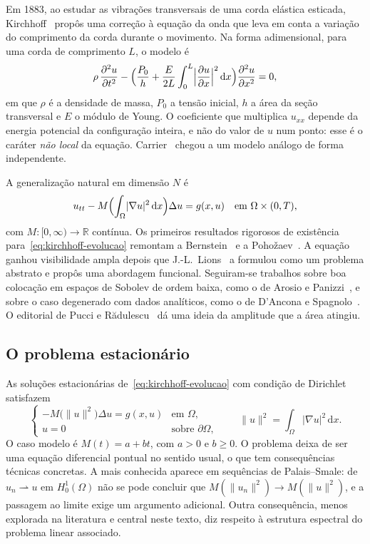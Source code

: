 \documentclass[11pt,a4paper]{article}
\theoremstyle{plain}
\theoremstyle{definition}
\theoremstyle{remark}
\newcommand{\R}{\mathbb{R}}
\newcommand{\Hz}{H_0^1(\Omega)}
\newcommand{\norm}[1]{\lVert #1\rVert}
\newcommand{\abs}[1]{\lvert #1\rvert}
\newcommand{\dx}{\,\mathrm{d}x}
\begin{document}
Em 1883, ao estudar as vibrações transversais de uma corda elástica esticada,
Kirchhoff~\cite{Kirchhoff1883} propôs uma correção à equação da onda que leva em
conta a variação do comprimento da corda durante o movimento. Na forma
adimensional, para uma corda de comprimento $L$, o modelo é
\begin{equation}\label{eq:kirchhoff-original}
\rho\, \frac{\partial^2 u}{\partial t^2}
-\Bigl(\frac{P_0}{h}+\frac{E}{2L}\int_0^L\Bigl|\frac{\partial u}{\partial x}\Bigr|^2\dx\Bigr)
\frac{\partial^2 u}{\partial x^2}=0,
\end{equation}
em que $\rho$ é a densidade de massa, $P_0$ a tensão inicial, $h$ a área da
seção transversal e $E$ o módulo de Young. O coeficiente que multiplica
$u_{xx}$ depende da energia potencial da configuração inteira, e não do valor de
$u$ num ponto: esse é o caráter \emph{não local} da equação. Carrier~\cite{Carrier1945}
chegou a um modelo análogo de forma independente.

A generalização natural em dimensão $N$ é
\begin{equation}\label{eq:kirchhoff-evolucao}
u_{tt}-M\Bigl(\int_\Omega\abs{\nabla u}^2\dx\Bigr)\Delta u=g(x,u)\quad\text{em }\Omega\times(0,T),
\end{equation}
com $M\colon[0,\infty)\to\R$ contínua. Os primeiros resultados rigorosos de
existência para~\eqref{eq:kirchhoff-evolucao} remontam a
Bernstein~\cite{Bernstein1940} e a Pohožaev~\cite{Pohozaev1975}. A equação
ganhou visibilidade ampla depois que J.-L.~Lions~\cite{Lions1978} a formulou
como um problema abstrato e propôs uma abordagem funcional. Seguiram-se
trabalhos sobre boa colocação em espaços de Sobolev de ordem baixa, como o de
Arosio e Panizzi~\cite{ArosioPanizzi1996}, e sobre o caso degenerado com dados
analíticos, como o de D'Ancona e Spagnolo~\cite{DanconaSpagnolo1992}. O
editorial de Pucci e Rădulescu~\cite{PucciRadulescu2019} dá uma ideia da
amplitude que a área atingiu.

\subsection{O problema estacionário}

As soluções estacionárias de~\eqref{eq:kirchhoff-evolucao} com condição de
Dirichlet satisfazem
\begin{equation}\label{eq:P-geral}
\begin{cases}
-M\bigl(\norm{u}^2\bigr)\Delta u=g(x,u) & \text{em }\Omega,\\
u=0 & \text{sobre }\partial\Omega,
\end{cases}
\qquad \norm{u}^2=\int_\Omega\abs{\nabla u}^2\dx .
\end{equation}
O caso modelo é $M(t)=a+bt$, com $a>0$ e $b\ge0$. O problema deixa de ser uma
equação diferencial pontual no sentido usual, o que tem consequências técnicas
concretas. A mais conhecida aparece em sequências de Palais--Smale: de
$u_n\rightharpoonup u$ em $\Hz$ não se pode concluir que
$M(\norm{u_n}^2)\to M(\norm{u}^2)$, e a passagem ao limite exige um argumento
adicional. Outra consequência, menos explorada na literatura e central neste
texto, diz respeito à estrutura espectral do problema linear associado.
\end{document}
